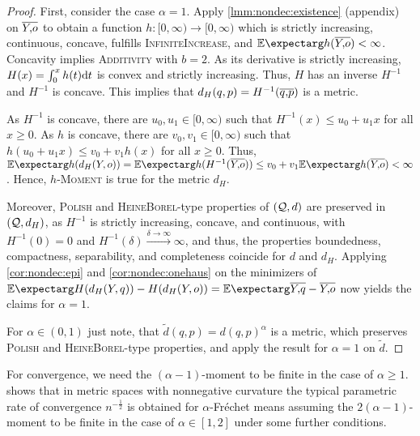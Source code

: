 \begin{proof}
First, consider the case $\alpha=1$.
Apply \autoref{lmm:nondec:existence} (appendix) on $\overline{Y,\!o}$ to obtain a function $h \colon [0,\infty) \to [0,\infty)$ which is strictly increasing, continuous, concave, fulfills \textsc{InfiniteIncrease}, and $\Ex{h(\ol Yo)} < \infty$. Concavity implies \textsc{Additivity} with $b=2$.
As its derivative is strictly increasing, $H(x) = \int_0^x h(t) \mathrm{d} t$ is convex and strictly increasing. Thus, $H$ has an inverse $H^{-1}$ and $H^{-1}$ is concave. 
This implies that $d_H(q,p) = H^{-1}(\overline{q,\!p})$ is a metric. 

As $H^{-1}$ is concave, there are $u_0, u_1 \in[0,\infty)$ such that $H^{-1}(x) \leq u_0 + u_1 x$ for all $x\geq0$.
As $h$ is concave, there are $v_0, v_1\in[0,\infty)$ such that $h(u_0 + u_1 x) \leq v_0 + v_1 h(x)$ for all $x\geq 0$.
Thus, $\Ex{h(d_H(Y, o))} = \Ex{h(H^{-1} (\ol Yo))} \leq v_0 + v_1 \Ex{h(\ol Yo)} < \infty$.
Hence, \textsc{$h$-Moment} is true for the metric $d_H$.

Moreover, \textsc{Polish} and \textsc{HeineBorel}-type properties of $(\mathcal{Q}, d)$ are preserved in $(\mathcal{Q}, d_H)$, as $H^{-1}$ is strictly increasing, concave, and continuous, with $H^{-1}(0) = 0$ and $H^{-1}(\delta)\xrightarrow{\delta\to\infty}\infty$, and thus, the properties boundedness, compactness, separability, and completeness coincide for $d$ and $d_H$.
Applying \autoref{cor:nondec:epi} and \autoref{cor:nondec:onehaus} on the minimizers of $\Ex{H(d_H(Y, q)) - H(d_H(Y, o))}  = \Ex{\ol  Yq - \ol Yo}$ now yields the claims for $\alpha=1$.

For $\alpha \in (0,1)$ just note, that $\tilde d(q,p) = d(q,p)^\alpha$ is a metric, which preserves \textsc{Polish} and \textsc{HeineBorel}-type properties, and apply the result for $\alpha = 1$ on $\tilde d$.
\end{proof}
%
\begin{remark}
	 For convergence, we need the $(\alpha-1)$-moment to be finite in the case of $\alpha \geq 1$. \cite[Corollary 5]{schoetz19} shows that in metric spaces with nonnegative curvature the typical parametric rate of convergence $n^{-\frac12}$ is obtained for $\alpha$-Fréchet means assuming the $2(\alpha-1)$-moment to be finite in the case of $\alpha\in[1,2]$ under some further conditions.
\end{remark}
%